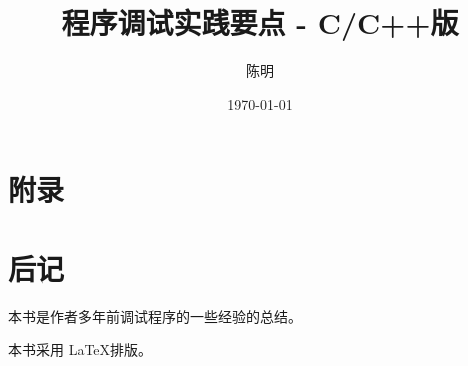 \documentclass[fontset=windows,UTF8,zihao=-4,a4paper]{ctexbook}
\begin{document}
\title{程序调试实践要点 - C/C++版}
\author{陈明}
\date{\today}

\maketitle

\cleardoublepage   %
\tableofcontents

\cleardoublepage   %
\listoffigures

\cleardoublepage   %
\listoftables























\appendix

\chapter{附录}

%
%
%
%
%
%

\chapter{后记}

本书是作者多年前调试程序的一些经验的总结。

本书采用 \LaTeX 排版。



\cleardoublepage   %

%


\printindex
\end{document}
